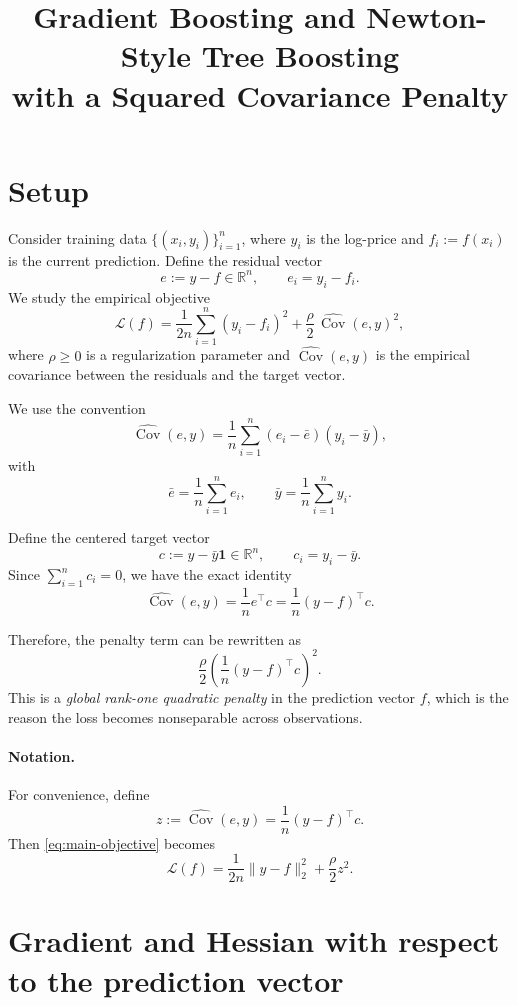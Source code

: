 \documentclass[11pt]{article}
\title{Gradient Boosting and Newton-Style Tree Boosting\\
with a Squared Covariance Penalty}
\author{}
\date{}
\newcommand{\R}{\mathbb{R}}
\newcommand{\1}{\mathbf{1}}
\newcommand{\Cov}{\operatorname{Cov}}
\begin{document}
\maketitle

\section{Setup}

Consider training data $\{(x_i,y_i)\}_{i=1}^n$, where $y_i$ is the log-price and $f_i := f(x_i)$ is the current prediction. Define the residual vector
\[
e := y - f \in \R^n,
\qquad
e_i = y_i - f_i.
\]
We study the empirical objective
\begin{equation}
\label{eq:main-objective}
\mathcal{L}(f)
=
\frac{1}{2n}\sum_{i=1}^n (y_i-f_i)^2
+
\frac{\rho}{2}\,\widehat{\Cov}(e,y)^2,
\end{equation}
where $\rho \ge 0$ is a regularization parameter and $\widehat{\Cov}(e,y)$ is the empirical covariance between the residuals and the target vector.

We use the convention
\[
\widehat{\Cov}(e,y)
=
\frac{1}{n}\sum_{i=1}^n (e_i-\bar e)(y_i-\bar y),
\]
with
\[
\bar e = \frac{1}{n}\sum_{i=1}^n e_i,
\qquad
\bar y = \frac{1}{n}\sum_{i=1}^n y_i.
\]

Define the centered target vector
\[
c := y - \bar y \1 \in \R^n,
\qquad
c_i = y_i - \bar y.
\]
Since $\sum_{i=1}^n c_i = 0$, we have the exact identity
\begin{equation}
\label{eq:cov-linear-form}
\widehat{\Cov}(e,y)
=
\frac{1}{n} e^\top c
=
\frac{1}{n}(y-f)^\top c.
\end{equation}

Therefore, the penalty term can be rewritten as
\[
\frac{\rho}{2}\left(\frac{1}{n}(y-f)^\top c\right)^2.
\]
This is a \emph{global rank-one quadratic penalty} in the prediction vector $f$, which is the reason the loss becomes nonseparable across observations.

\paragraph{Notation.}
For convenience, define
\begin{equation}
\label{eq:def-z}
z := \widehat{\Cov}(e,y) = \frac{1}{n}(y-f)^\top c.
\end{equation}
Then \eqref{eq:main-objective} becomes
\[
\mathcal{L}(f)
=
\frac{1}{2n}\|y-f\|_2^2 + \frac{\rho}{2} z^2.
\]

\section{Gradient and Hessian with respect to the prediction vector}
\end{document}

